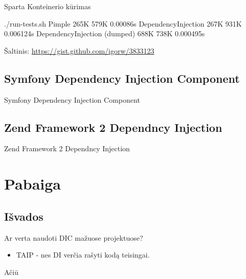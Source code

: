 \documentclass[12pt,a4paper]{beamer}
\begin{document}
\begin{frame}[fragile]{Sparta}
    Konteinerio kūrimas
    \vskip0.5cm
\begin{bashcode}
    ./run-tests.sh 
    Pimple
    265K
    579K
    0.00086s
    DependencyInjection
    267K
    931K
    0.006124s
    DependencyInjection (dumped)
    688K
    738K
    0.000495s
\end{bashcode}
    \vskip0.25cm
    \scriptsize{Šaltinis: \href{https://gist.github.com/igorw/3833123}{https://gist.github.com/igorw/3833123}}
\end{frame}


\subsection{Symfony Dependency Injection Component}
\begin{frame}
	\begin{center}
        {\Huge Symfony Dependency Injection Component}
	\end{center}
\end{frame}

\subsection{Zend Framework 2 Dependncy Injection}
\begin{frame}
	\begin{center}
        {\Huge Zend Framework 2 Dependncy Injection}
	\end{center}
\end{frame}

\section{Pabaiga}

\subsection{Išvados}
\begin{frame}{Ar verta naudoti DIC mažuose projektuose?}
    \begin{itemize}
        \item TAIP - nes DI verčia rašyti kodą teisingai.
    \end{itemize}
\end{frame}
\begin{frame}
	\begin{center}
        {\Huge Ačiū}
	\end{center}
\end{frame}
\end{document}
